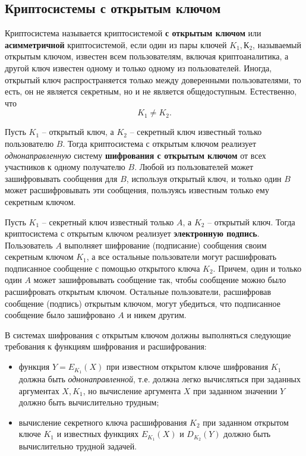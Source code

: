 \subsection{Криптосистемы с открытым ключом}

Криптосистема называется криптосистемой \textbf{с открытым ключом} или \textbf{асимметричной} криптосистемой, если один из пары ключей $K_1, К_2$, называемый открытым ключом, известен всем пользователям, включая криптоаналитика, а другой ключ известен одному и только одному из пользователей. Иногда, открытый ключ распространяется только между доверенными пользователями, то есть, он не является секретным, но и не является общедоступным. Естественно, что
    \[ K_1 \neq K_2. \]

Пусть $K_1$ -- открытый ключ, а $K_2$ -- секретный ключ известный только пользователю $B$. Тогда криптосистема с открытым ключом реализует \emph{однонаправленную} систему \textbf{шифрования с открытым ключом} от всех участников к одному получателю $B$. Любой из пользователей может зашифровывать сообщения для $B$, используя открытый ключ, и только один $B$ может расшифровывать эти сообщения, пользуясь известным только ему секретным ключом.

Пусть $K_1$ -- секретный ключ известный только $A$, а $K_2$ -- открытый ключ. Тогда криптосистема с открытым ключом реализует \textbf{электронную подпись}. Пользователь $A$ выполняет шифрование (подписание) сообщения своим секретным ключом $K_1$, а все остальные пользователи могут расшифровать подписанное сообщение с помощью открытого ключа $K_2$. Причем, один и только один $A$ может зашифровывать сообщение так, чтобы сообщение можно было расшифровать открытым ключом. Остальные пользователи, расшифровав сообщение (подпись) открытым ключом, могут убедиться, что подписанное сообщение было зашифровано $A$ и никем другим.

В системах шифрования с открытым ключом должны выполняться следующие требования к функциям шифрования и расшифрования:
\begin{itemize}
   \item функция $Y = E_{K_1}(X)$ при известном открытом ключе шифрования $K_1$ должна быть \emph{однонаправленной}, т.е. должна легко вычисляться при заданных аргументах $X, K_1$, но вычисление аргумента $X$ при заданном значении $Y$ должно быть вычислительно трудным;
   \item вычисление секретного ключа расшифрования $K_2$ при заданном открытом ключе $K_1$ и известных функциях $E_{K_1}(X)$ и $D_{K_2}(Y)$  должно быть вычислительно трудной задачей.
\end{itemize}

